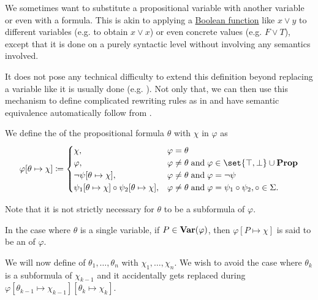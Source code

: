 \begin{definition}\label{def:propositional_substitution}
  We sometimes want to substitute a propositional variable with another variable or even with a formula. This is akin to applying a \hyperref[def:boolean_function]{Boolean function} like \( x \vee y \) to different variables (e.g. to obtain \( x \vee x \)) or even concrete values (e.g. \( F \vee T \)), except that it is done on a purely syntactic level without involving any semantics involved.

  It does not pose any technical difficulty to extend this definition beyond replacing a variable like it is usually done (e.g. \cite[def. 7.8]{OpenLogicFull}). Not only that, we can then use this mechanism to define complicated rewriting rules as in  and have semantic equivalence automatically follow from .

  \begin{thmenum}
     We define the  of the propositional formula \( \theta \) with \( \chi \) in \( \varphi \) as
    \begin{equation}\label{eq:def:propositional_substitution/single}
      \varphi[\theta \mapsto \chi] \coloneqq \begin{cases}
        \chi,                                                             &\varphi = \theta \\
        \varphi,                                                          &\varphi \neq \theta \T{and} \varphi \in \set{ \top, \bot } \cup \boldop{Prop} \\
        \neg \psi[\theta \mapsto \chi],                                   &\varphi \neq \theta \T{and} \varphi = \neg \psi \\
        \psi_1[\theta \mapsto \chi] \bincirc \psi_2[\theta \mapsto \chi], &\varphi \neq \theta \T{and} \varphi = \psi_1 \bincirc \psi_2, \circ \in \Sigma.
      \end{cases}
    \end{equation}

    Note that it is not strictly necessary for \( \theta \) to be a subformula of \( \varphi \).

    In the case where \( \theta \) is a single variable, if \( P \in \operatorname{\mathbf{Var}}(\varphi) \), then \( \varphi[P \mapsto \chi] \) is said to be an  of \( \varphi \).

     We will now define  of \( \theta_1, \ldots, \theta_n \) with \( \chi_1, \ldots, \chi_n \). We wish to avoid the case where \( \theta_k \) is a subformula of \( \chi_{k-1} \) and it accidentally gets replaced during \( \varphi[\theta_{k-1} \mapsto \chi_{k-1}][\theta_k \mapsto \chi_k] \).


\end{thmenum}
\end{definition}
